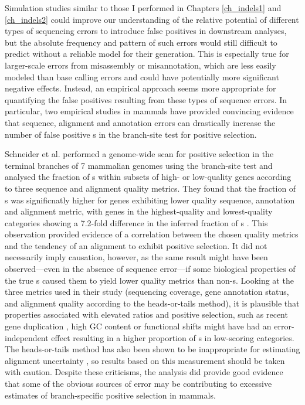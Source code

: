 Simulation studies similar to those I performed in Chapters
\ref{ch_indels1} and \ref{ch_indels2} could improve our understanding
of the relative potential of different types of sequencing errors to
introduce false positives in downstream analyses, but the absolute
frequency and pattern of such errors would still difficult to predict
without a reliable model for their generation. This is especially true
for larger-scale errors from misassembly or misannotation, which are
less easily modeled than base calling errors and could have
potentially more significant negative effects. Instead, an empirical
approach seems more appropriate for quantifying the false positives
resulting from these types of sequence errors. In particular, two
empirical studies in mammals have provided convincing evidence that
sequence, alignment and annotation errors can drastically increase the
number of false positive \psg{}s in the branch-site test for positive
selection.

Schneider et al. \citeyearpar{Schneider2009} performed a genome-wide
scan for positive selection in the terminal branches of 7 mammalian
genomes using the branch-site test and analysed the fraction of
\psg{}s within subsets of high- or low-quality genes according to
three sequence and alignment quality metrics. They found that the
fraction of \psg{}s was significnatly higher for genes exhibiting
lower quality sequence, annotation and alignment metric, with genes in
the highest-quality and lowest-quality categories showing a 7.2-fold
difference in the inferred fraction of \psg{}s
\citep{Schneider2009}. This observation provided evidence of a
correlation between the chosen quality metrics and the tendency of an
alignment to exhibit positive selection. It did not necessarily imply
causation, however, as the same result might have been observed---even
in the absence of sequence error---if some biological properties of
the true \psg{}s caused them to yield lower quality metrics than
non-\psg{}s. Looking at the three metrics used in their study
(sequencing coverage, gene annotation status, and alignment quality
according to the heads-or-tails method), it is plausible that
properties associated with elevated \omg ratios and positive
selection, such as recent gene duplication
\citep{Beisswanger2008,Studer2008,Casola2009}, high GC content
\citep{Ratnakumar2010} or functional shifts \citep{Storz2008,Wang2001}
might have had an error-independent effect resulting in a higher
proportion of \psg{}s in low-scoring categories. The heads-or-tails
method has also been shown to be inappropriate for estimating
alignment uncertainty \citep{Fletcher2010}, so results based on this
measurement should be taken with caution. Despite these criticisms,
the analysis did provide good evidence that some of the obvious
sources of error may be contributing to excessive estimates of
branch-specific positive selection in mammals.

